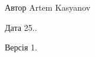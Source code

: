 \begin{DoxyAuthor}{Автор}
Artem Kasyanov 
\end{DoxyAuthor}
\begin{DoxyDate}{Дата}
25.. 
\end{DoxyDate}
\begin{DoxyVersion}{Версія}
1. 
\end{DoxyVersion}
